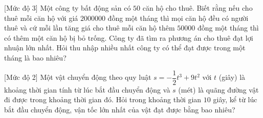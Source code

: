 \begin{bt}%
[Mức độ 3]%
	Một công ty bất động sản có $50$ căn hộ cho thuê. Biết rằng nếu cho thuê mỗi căn hộ với giá $2000000$ đồng một tháng thì mọi căn hộ đều có người thuê và cứ mỗi lần tăng giá cho thuê mỗi căn hộ thêm $50000$ đồng một tháng thì có thêm một căn hộ bị bỏ trống. Công ty đã tìm ra phương án cho thuê đạt lợi nhuận lớn nhất. Hỏi thu nhập nhiều nhất công ty có thể đạt được trong một tháng là bao nhiêu?
\end{bt}

\begin{bt}%
[Mức độ 2]%
	Một vật chuyển động theo quy luật $s=-\dfrac{1}{2}t^3+9t^2$ với $t$ (giây) là khoảng thời gian tính từ lúc bắt đầu chuyển động và $s$ (mét) là quãng đường vật đi được trong khoảng thời gian đó. Hỏi trong khoảng thời gian $10$ giây, kể từ lúc bắt đầu chuyển động, vận tốc lớn nhất của vật đạt được bằng bao nhiêu?
\end{bt}

